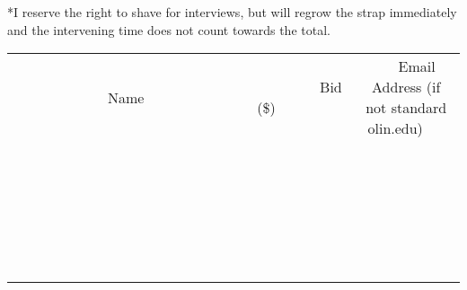 \documentclass[11pt]{article}
\begin{document}
*I reserve the right to shave for interviews, but will regrow the strap immediately and the intervening time does not count towards the total.
\\[6ex]
\begin{tabular}{c c c}
~~~~~~~~~~~~~Name~~~~~~~~~~~~~ & ~~~~~~~~~Bid (\$)~~~~~~~~~  & ~~~Email Address (if not standard olin.edu)~~~\\
 & & \\
\hline
 & & \\
\hline
 & & \\
\hline
 & & \\
\hline
 & & \\
\hline
 & & \\
\hline
 & & \\
\hline
 & & \\
\hline
 & & \\
\hline
 & & \\
\hline
 & & \\
\hline
 & & \\
\hline
 & & \\
\hline
 & & \\
\hline
 & & \\
\hline
 & & \\
\hline
 & & \\
\hline
 & & \\
\hline
 & & \\
\hline
 & & \\
\hline
 & & \\
\hline
 & & \\
\hline
 & & \\
\hline
 & & \\
\hline
 & & \\
\hline
 & & \\
\hline
\end{tabular}
\newpage
\end{document}

